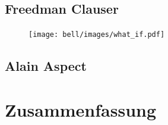 \begin{refsection}
\subsection{Freedman Clauser}
    
    \begin{figure}[ht!]
        \centering
        \texttt{[image: bell/images/what\_if.pdf]}
    \end{figure}
    
\subsection{Alain Aspect}

\section{Zusammenfassung}


\printbibliography[heading=subbibliography]
\end{refsection}


